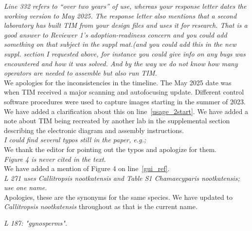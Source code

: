 \documentclass[12pt,a4paper]{article}
\newcommand{\lr}[1]{line~\ref{#1}}
\begin{document}
\emph{Line 332 refers to ``over two years” of use, whereas your response letter dates the working version to May 2025. The response letter also mentions that a second laboratory has built TIM from your design files and uses it for research. That is a good answer to Reviewer 1's adoption-readiness concern and you could add something on that subject in the suppl mat.(and you could add this in the new suppl. section I requested above, for instance you could give info on any bugs was encountered and how it was solved. And by the way we do not know how many operators are needed to assemble but also run TIM.} \\

We apologies for the inconsistencies in the timeline. The May 2025 date was when TIM received a major scanning and autofocusing update. Different control software procedures were used to capture images starting in the summer of 2023. We have added a clarification about this on \lr{usage_2start}. We have added a note about TIM being recreated by another lab in the supplemental section describing the electronic diagram and assembly instructions. \\

\emph{I could find several typos still in the paper, e.g.;} \\

We thank the editor for pointing out the typos and apologize for them. \\

\emph{Figure 4 is never cited in the text.} \\

We have added a mention of Figure 4 on \lr{gui_ref}. \\

\emph{L 271 uses Callitropsis nootkatensis and Table S1 Chamaecyparis nootkatensis; use one name.} \\

Apologies, these are the synonyms for the same species. We have updated to \emph{Callitropsis nootkatensis} throughout as that is the current name.  

\emph{L 187: "gynosperms".} \\
\end{document}
